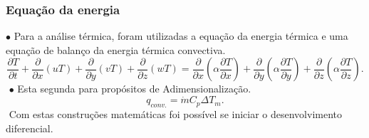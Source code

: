 \documentclass[xcolor=dvipsnames,10pt,aspectratio=169]{beamer}
\begin{document}





		\begin{frame}
		\frametitle{Equação da energia}
		$\bullet$ Para a análise térmica, foram utilizadas a equação da energia térmica e uma equação de balanço da energia térmica convectiva.
		\begin{equation}
		\frac{\partial T}{\partial t} + {\frac{\partial{}}{\partial{x}} (uT)} + {\frac{\partial{}}{\partial{y}} (vT)} + {\frac{\partial{}}{\partial{z}} (wT)}
		=
		{\frac{\partial{}}{\partial{x}}} \left(\alpha {\frac{\partial{T}}{\partial{x}}} \right) +
		{\frac{\partial{}}{\partial{y}}} \left(\alpha {\frac{\partial{T}}{\partial{y}}} \right) +
		{\frac{\partial{}}{\partial{z}}} \left(\alpha {\frac{\partial{T}}{\partial{z}}} \right) .
		\end{equation}
		$ $
		$\bullet$ Esta segunda para propósitos de Adimensionalização.
		\begin{equation}\label{c_h_e}
		q_{conv.} = \dot{m} C_p \Delta T_m.
		\end{equation}
		$ $
		Com estas construções matemáticas foi possível se iniciar o desenvolvimento diferencial.
		\end{frame}




		
		
\end{document}
